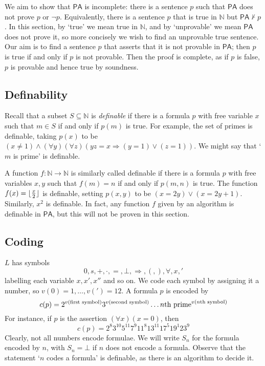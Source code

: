 We aim to show that \( \mathsf{PA} \) is incomplete: there is a sentence \( p \) such that \( \mathsf{PA} \) does not prove \( p \) or \( \neg p \).
Equivalently, there is a sentence \( p \) that is true in \( \mathbb N \) but \( \mathsf{PA} \not\vdash p \).
In this section, by `true' we mean true in \( \mathbb N \), and by `unprovable' we mean \( \mathsf{PA} \) does not prove it, so more concisely we wish to find an unprovable true sentence.
Our aim is to find a sentence \( p \) that asserts that it is not provable in \( \mathsf{PA} \); then \( p \) is true if and only if \( p \) is not provable.
Then the proof is complete, as if \( p \) is false, \( p \) is provable and hence true by soundness.

\subsection{Definability}
Recall that a subset \( S \subseteq \mathbb N \) is \emph{definable} if there is a formula \( p \) with free variable \( x \) such that \( m \in S \) if and only if \( p(m) \) is true.
For example, the set of primes is definable, taking \( p(x) \) to be \( (x \neq 1) \wedge (\forall y)(\forall z)(yz = x \Rightarrow (y = 1) \vee (z = 1)) \).
We might say that `\( m \) is prime' is definable.

A function \( f \colon \mathbb N \to \mathbb N \) is similarly called definable if there is a formula \( p \) with free variables \( x, y \) such that \( f(m) = n \) if and only if \( p(m,n) \) is true.
The function \( f(x) = \lfloor\frac{x}{2}\rfloor \) is definable, setting \( p(x,y) \) to be \( (x = 2y) \vee (x = 2y + 1) \).
Similarly, \( x^2 \) is definable.
In fact, any function \( f \) given by an algorithm is definable in \( \mathsf{PA} \), but this will not be proven in this section.

\subsection{Coding}
\( L \) has symbols
\[ 0, s, +, \cdot, =, \bot, \Rightarrow, (, ), \forall, x, ' \]
labelling each variable \( x, x', x'' \) and so on.
We code each symbol by assigning it a number, so \( v(0) = 1, \dots, v(') = 12 \).
A formula \( p \) is encoded by
\[ c(p) = 2^{v(\text{first symbol})} 3^{v(\text{second symbol})} \dots \text{\( n \)th prime}^{v(\text{\( n \)th symbol})} \]
For instance, if \( p \) is the assertion \( (\forall x)(x=0) \), then
\[ c(p) = 2^8 3^{10} 5^{11} 7^9 11^8 13^{11} 17^5 19^1 23^9 \]
Clearly, not all numbers encode formulae.
We will write \( S_n \) for the formula encoded by \( n \), with \( S_n = \bot \) if \( n \) does not encode a formula.
Observe that the statement `\( n \) codes a formula' is definable, as there is an algorithm to decide it.

